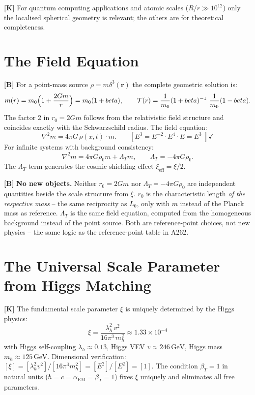 \textbf{[K]} For quantum computing applications and atomic scales
($R/r\gg10^{12}$) only the localised spherical geometry is relevant; the others
are for theoretical completeness.

\section{The Field Equation}

\textbf{[B]} For a point-mass source $\rho=m\delta^3(\mathbf r)$ the complete
geometric solution is:
\[
  m(r) = m_0\Bigl(1+\frac{2Gm}{r}\Bigr) = m_0(1+\beta),
  \qquad
  \mathcal T(r) = \frac{1}{m_0}(1+\beta)^{-1}\approx\frac{1}{m_0}(1-\beta).
\]
The factor 2 in $r_0=2Gm$ follows from the relativistic field structure and
coincides exactly with the Schwarzschild radius. The field equation:
\[
  \nabla^2 m = 4\pi G\,\rho(x,t)\cdot m.
  \qquad [E^3 = E^{-2}\cdot E^4\cdot E = E^3\;]\checkmark
\]
For infinite systems with background consistency:
\[
  \nabla^2 m = 4\pi G\rho_0 m + \Lambda_T m,
  \qquad \Lambda_T = -4\pi G\rho_0.
\]
The $\Lambda_T$ term generates the cosmic shielding effect $\xi_\text{eff}=\xi/2$.

\textbf{[B]} \textbf{No new objects.} Neither $r_0=2Gm$ nor
$\Lambda_T=-4\pi G\rho_0$ are independent quantities beside the scale structure
from $\xi$. $r_0$ is the characteristic length \emph{of the respective mass} --
the same reciprocity as $L_0$, only with $m$ instead of the Planck mass as
reference. $\Lambda_T$ is the same field equation, computed from the homogeneous
background instead of the point source. Both are reference-point choices, not new
physics -- the same logic as the reference-point table in A262.

\section{The Universal Scale Parameter from Higgs Matching}

\textbf{[K]} The fundamental scale parameter $\xi$ is uniquely determined by the
Higgs physics:
\[
  \boxed{\;\xi = \frac{\lambda_h^2\,v^2}{16\pi^3\,m_h^2}
  \approx 1{.}33\times10^{-4}\;}
\]
with Higgs self-coupling $\lambda_h\approx0{.}13$, Higgs VEV $v\approx246\,\text{GeV}$,
Higgs mass $m_h\approx125\,\text{GeV}$. Dimensional verification:
$[\xi]=[\lambda_h^2 v^2]/[16\pi^3 m_h^2]=[E^2]/[E^2]=[1]$. The condition
$\beta_T=1$ in natural units ($\hbar=c=\alpha_\text{EM}=\beta_T=1$) fixes $\xi$
uniquely and eliminates all free parameters.

